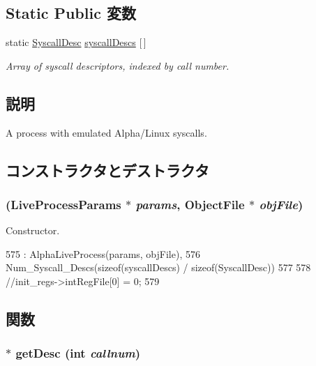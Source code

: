 \subsection*{Static Public 変数}
\begin{DoxyCompactItemize}
\item 
static \hyperlink{classSyscallDesc}{SyscallDesc} \hyperlink{classAlphaISA_1_1AlphaLinuxProcess_a08d67a94820b75842e07f030e548372e}{syscallDescs} \mbox{[}$\,$\mbox{]}
\begin{DoxyCompactList}\small\item\em Array of syscall descriptors, indexed by call number. \item\end{DoxyCompactList}\end{DoxyCompactItemize}


\subsection{説明}
A process with emulated Alpha/Linux syscalls. 

\subsection{コンストラクタとデストラクタ}
\hypertarget{classAlphaISA_1_1AlphaLinuxProcess_aa748382496fdd00b4d1cff0ef1afa8bc}{
\subsubsection[{AlphaLinuxProcess}]{ (LiveProcessParams $\ast$ {\em params}, \/  {\bf ObjectFile} $\ast$ {\em objFile})}}
\label{classAlphaISA_1_1AlphaLinuxProcess_aa748382496fdd00b4d1cff0ef1afa8bc}


Constructor. 


\begin{DoxyCode}
575     : AlphaLiveProcess(params, objFile),
576      Num_Syscall_Descs(sizeof(syscallDescs) / sizeof(SyscallDesc))
577 {
578     //init_regs->intRegFile[0] = 0;
579 }
\end{DoxyCode}


\subsection{関数}
\hypertarget{classAlphaISA_1_1AlphaLinuxProcess_aebbff609a7235342925445690acf5ee8}{
\subsubsection[{getDesc}]{ $\ast$ getDesc (int {\em callnum})}}
\label{classAlphaISA_1_1AlphaLinuxProcess_aebbff609a7235342925445690acf5ee8}


